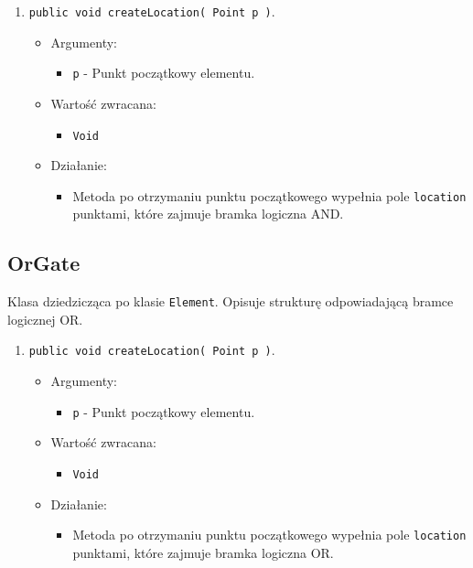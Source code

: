 \documentclass[a4paper,11pt, notitlepage ]{article}
\begin{document}
\begin{enumerate}
\item \verb+public void createLocation( Point p )+.
\begin{itemize}
\item Argumenty:
\begin{itemize}
\item \verb+p+ - Punkt początkowy elementu.
\end{itemize}
\item Wartość zwracana:
\begin{itemize}
\item \verb+Void+
\end{itemize}
\item Działanie:
\begin{itemize}
\item Metoda po otrzymaniu punktu początkowego wypełnia pole \verb+location+ punktami, które zajmuje bramka logiczna AND.
\end{itemize}
\end{itemize}
\end{enumerate}

\subsection{OrGate}
Klasa dziedzicząca po klasie \verb+Element+. Opisuje strukturę odpowiadającą bramce logicznej OR.

\begin{enumerate}
\item \verb+public void createLocation( Point p )+.
\begin{itemize}
\item Argumenty:
\begin{itemize}
\item \verb+p+ - Punkt początkowy elementu.
\end{itemize}
\item Wartość zwracana:
\begin{itemize}
\item \verb+Void+
\end{itemize}
\item Działanie:
\begin{itemize}
\item Metoda po otrzymaniu punktu początkowego wypełnia pole \verb+location+ punktami, które zajmuje bramka logiczna OR.
\end{itemize}
\end{itemize}
\end{enumerate}
\end{document}
